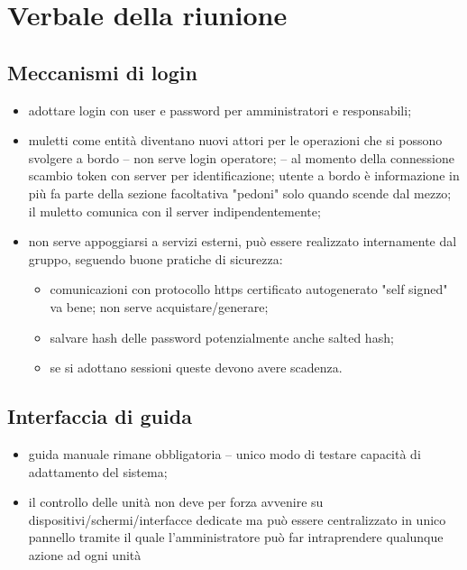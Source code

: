 \section{Verbale della riunione}

\subsection{Meccanismi di login}
    \begin{itemize}
        \item adottare login con user e password per amministratori e responsabili;
        \item muletti come entità diventano nuovi attori per le operazioni che si possono svolgere a bordo
            \subitem -- non serve login operatore;
            \subitem -- al momento della connessione scambio token con server per identificazione;
            \subitem utente a bordo è informazione in più
                \subsubitem * fa parte della sezione facoltativa "pedoni" solo quando scende dal mezzo;
            \subitem il muletto comunica con il server indipendentemente;
        \item non serve appoggiarsi a servizi esterni, può essere realizzato internamente dal gruppo, seguendo buone pratiche di sicurezza:
            \begin{itemize}
                \item comunicazioni con protocollo https
                    \subitem * certificato autogenerato "self signed" va bene;
                    \subitem * non serve acquistare/generare;
                \item salvare hash delle password
                    \subitem * potenzialmente anche salted hash;
                \item se si adottano sessioni queste devono avere scadenza.
            \end{itemize}
    \end{itemize}

\subsection{Interfaccia di guida}
    \begin{itemize}
        \item guida manuale rimane obbligatoria
            \subitem -- unico modo di testare capacità di adattamento del sistema;
        \item il controllo delle unità non deve per forza avvenire su dispositivi/schermi/interfacce dedicate ma può essere centralizzato in unico pannello tramite il quale l'amministratore può far intraprendere qualunque azione ad ogni unità
    \end{itemize}

